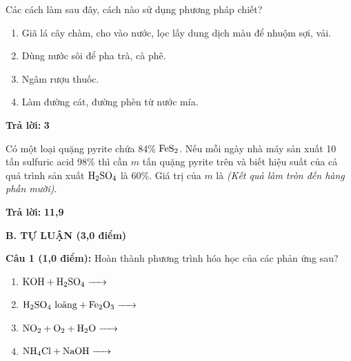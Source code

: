 \documentclass[11pt,a4paper]{article}
\begin{document}
\begin{ex}
Các cách làm sau đây, cách nào sử dụng phương pháp chiết?
\begin{enumerate}[label=(\arabic*),leftmargin=20pt,itemsep=0pt]
\item Giã lá cây chàm, cho vào nước, lọc lấy dung dịch màu để nhuộm sợi, vải.
\item Dùng nước sôi để pha trà, cà phê.
\item Ngâm rượu thuốc.
\item Làm đường cát, đường phèn từ nước mía.
\end{enumerate}
\par\textbf{Trả lời:} \textbf{\color{hfRed}3}
\end{ex}
\begin{ex}
Có một loại quặng pyrite chứa 84\% $\ce{FeS2}$. Nếu mỗi ngày nhà máy sản xuất 10 tấn sulfuric acid 98\% thì cần $m$ tấn quặng pyrite trên và biết hiệu suất của cả quá trình sản xuất $\ce{H2SO4}$ là 60\%. Giá trị của $m$ là \textit{(Kết quả làm tròn đến hàng phần mười)}.
\par\textbf{Trả lời:} \textbf{\color{hfRed}11,9}
\end{ex}

\vspace{6pt}
{\large\bfseries\color{mainGreen} B. TỰ LUẬN (3,0 điểm)}

\vspace{3pt}
\textbf{Câu 1 (1,0 điểm):} Hoàn thành phương trình hóa học của các phản ứng sau?
\begin{enumerate}[label=\alph*),leftmargin=25pt,itemsep=2pt]
\item $\ce{KOH + H2SO4 ->}$
\item $\ce{H2SO4\text{ loãng} + Fe2O3 ->}$
\item $\ce{NO2 + O2 + H2O ->}$
\item $\ce{NH4Cl + NaOH ->}$
\end{enumerate}
\end{document}
